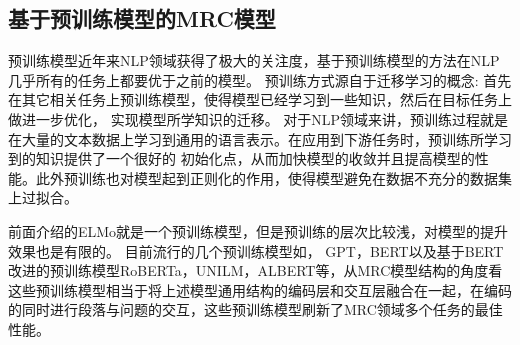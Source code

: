 \subsection{基于预训练模型的MRC模型}
预训练模型近年来NLP领域获得了极大的关注度，基于预训练模型的方法在NLP几乎所有的任务上都要优于之前的模型。
预训练方式源自于迁移学习的概念: 首先在其它相关任务上预训练模型，使得模型已经学习到一些知识，然后在目标任务上做进一步优化，
实现模型所学知识的迁移。
对于NLP领域来讲，预训练过程就是在大量的文本数据上学习到通用的语言表示。在应用到下游任务时，预训练所学习到的知识提供了一个很好的
初始化点，从而加快模型的收敛并且提高模型的性能。此外预训练也对模型起到正则化的作用，使得模型避免在数据不充分的数据集上过拟合。

前面介绍的ELMo就是一个预训练模型，但是预训练的层次比较浅，对模型的提升效果也是有限的。
目前流行的几个预训练模型如，
GPT，BERT以及基于BERT改进的预训练模型RoBERTa，UNILM，ALBERT等，从MRC模型结构的角度看这些预训练模型相当于将上述模型通用结构的编码层和交互层融合在一起，在编码的同时进行段落与问题的交互，这些预训练模型刷新了MRC领域多个任务的最佳性能。

